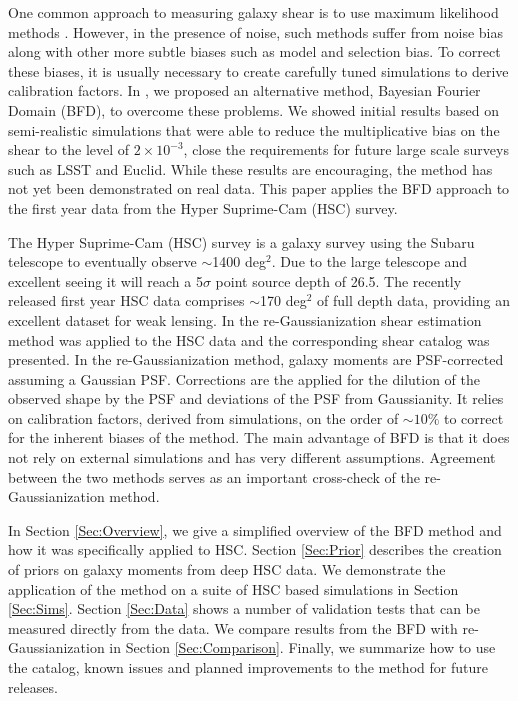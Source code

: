 \documentclass[useAMS,usenatbib]{mnras}
\begin{document}
One common approach to measuring galaxy shear is to use maximum likelihood methods \citep{2013MNRAS.429.2858M, 2016MNRAS.tmp..827J, 2016arXiv160605337F, 2017MNRAS.467.1627F}.  However, in the presence of noise, such methods suffer from noise bias \citep{2012MNRAS.424.2757M,2012MNRAS.425.1951R,2012MNRAS.427.2711K} along with other more subtle biases such as model \citep{2010MNRAS.404..458V} and selection bias.   To correct these biases, it is usually necessary to create carefully tuned simulations to derive calibration factors.  In \cite{Bernstein2015,Bernstein2016}, we proposed an alternative method, Bayesian Fourier Domain (BFD), to overcome these problems.  We showed initial results based on semi-realistic simulations that were able to reduce the multiplicative bias on the shear to the level of $2\times 10^{-3}$, close the requirements for future large scale surveys such as LSST and Euclid.  While these results are encouraging, the method has not yet been demonstrated on real data.  This paper applies the BFD approach to the first year data from the Hyper Suprime-Cam (HSC) survey.

The Hyper Suprime-Cam (HSC) \citep{SurveyOverview} survey is a galaxy survey using the Subaru telescope to eventually observe $\sim$1400 deg$^2$.  Due to the large telescope and excellent seeing it will reach a 5$\sigma$ point source depth of 26.5.  The recently released first year HSC data \citep{DataPaper:inprep} comprises $\sim$170 deg$^2$ of full depth data, providing an excellent dataset for weak lensing.  In \cite{ShearPaper:inprep} the re-Gaussianization \citep{2003MNRAS.343..459H} shear estimation method was applied to the HSC data and the corresponding shear catalog was presented.  In the re-Gaussianization method, galaxy moments are PSF-corrected assuming a Gaussian PSF.  Corrections are the applied for the dilution of the observed shape by the PSF and deviations of the PSF from Gaussianity.  It relies on calibration factors, derived from simulations, on the order of $\sim10\%$ to correct for the inherent biases of the method.  The main advantage of BFD is that it does not rely on external simulations and has very different assumptions.  Agreement between the two methods serves as an important cross-check of the re-Gaussianization method.

In Section \ref{Sec:Overview}, we give a simplified overview of the BFD method and how it was specifically applied to HSC.  Section \ref{Sec:Prior} describes the creation of priors on galaxy moments from deep HSC data.  We demonstrate the application of the method on a suite of HSC based simulations in Section \ref{Sec:Sims}. Section \ref{Sec:Data} shows a number of validation tests that can be measured directly from the data.  We compare results from the BFD with re-Gaussianization in Section \ref{Sec:Comparison}.  Finally, we summarize how to use the catalog, known issues and planned improvements to the method for future releases.
\end{document}
